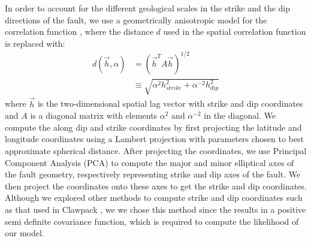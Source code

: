 {In order to account for the different geological scales in the strike and the dip directions of the fault, we use a geometrically anisotropic model for the correlation function \citep[p. 39]{handbook}, where the distance $d$ used in the spatial correlation function is replaced with:
\begin{align*}
d(\vec{h}, \alpha ) &=  (\vec{h}^T A \vec{h})^{1 / 2} \\
& \equiv  \sqrt{\alpha^2 h_{strike}^2 + \alpha^{-2} h_{dip}^2} 
\end{align*}
where $\vec{h}$ is the two-dimensional spatial lag vector with strike and dip coordinates and $A$ is a diagonal matrix with elements $ \alpha^2$ and $ \alpha^{-2}$ in the diagonal. We compute the along dip and strike coordinates by first projecting the latitude and longitude coordinates using a Lambert projection with parameters chosen to best approximate spherical distance. After projecting the coordinates, we use Principal Component Analysis (PCA) to compute the major and minor elliptical axes of the fault geometry, respectively representing strike and dip axes of the fault. We then project the coordinates onto these axes to get the strike and dip coordinates. Although we explored other methods to compute strike and dip coordinates such as that used in Clawpack \citep{clawpack}, we we chose this method since the results in a positive semi definite covariance function, which is required to compute the likelihood of our model.

}
